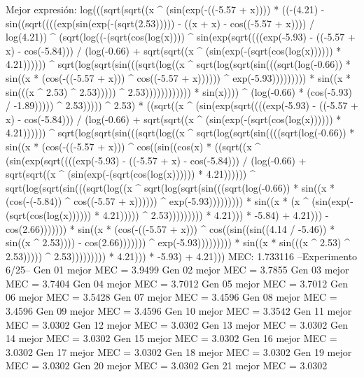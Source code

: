 Mejor expresión: log(((sqrt(sqrt((x ^ (sin(exp(-((-5.57 + x)))) * ((-(4.21) - sin((sqrt((((exp(sin(exp(-(sqrt(2.53))))) - ((x + x) - cos((-5.57 + x)))) / log(4.21)) ^ (sqrt(log((-(sqrt(cos(log(x)))) ^ sin(exp(sqrt((((exp(-5.93) - ((-5.57 + x) - cos(-5.84))) / (log(-0.66) + sqrt(sqrt((x ^ (sin(exp(-(sqrt(cos(log(x)))))) * 4.21)))))) ^ sqrt(log(sqrt(sin(((sqrt(log((x ^ sqrt(log(sqrt(sin(((sqrt(log(-0.66)) * sin((x * (cos(-((-5.57 + x))) ^ cos((-5.57 + x)))))) ^ exp(-5.93))))))))) * sin((x * sin(((x ^ 2.53) ^ 2.53))))) ^ 2.53)))))))))))) * sin(x)))) ^ (log(-0.66) * (cos(-5.93) / -1.89))))) ^ 2.53))))) ^ 2.53) * ((sqrt((x ^ (sin(exp(sqrt((((exp(-5.93) - ((-5.57 + x) - cos(-5.84))) / (log(-0.66) + sqrt(sqrt((x ^ (sin(exp(-(sqrt(cos(log(x)))))) * 4.21)))))) ^ sqrt(log(sqrt(sin(((sqrt(log((x ^ sqrt(log(sqrt(sin((((sqrt(log(-0.66)) * sin((x * (cos(-((-5.57 + x))) ^ cos((sin((cos(x) * ((sqrt((x ^ (sin(exp(sqrt((((exp(-5.93) - ((-5.57 + x) - cos(-5.84))) / (log(-0.66) + sqrt(sqrt((x ^ (sin(exp(-(sqrt(cos(log(x)))))) * 4.21)))))) ^ sqrt(log(sqrt(sin(((sqrt(log((x ^ sqrt(log(sqrt(sin(((sqrt(log(-0.66)) * sin((x * (cos(-(-5.84)) ^ cos((-5.57 + x)))))) ^ exp(-5.93))))))))) * sin((x * (x ^ (sin(exp(-(sqrt(cos(log(x)))))) * 4.21))))) ^ 2.53))))))))) * 4.21))) * -5.84) + 4.21))) - cos(2.66))))))) * sin((x * (cos(-((-5.57 + x))) ^ cos((sin((sin((4.14 / -5.46)) * sin((x ^ 2.53)))) - cos(2.66))))))) ^ exp(-5.93))))))))) * sin((x * sin(((x ^ 2.53) ^ 2.53))))) ^ 2.53))))))))) * 4.21))) * -5.93) + 4.21)))
MEC: 1.733116
--Experimento 
 6/25--
Gen 01 mejor MEC = 3.9499
Gen 02 mejor MEC = 3.7855
Gen 03 mejor MEC = 3.7404
Gen 04 mejor MEC = 3.7012
Gen 05 mejor MEC = 3.7012
Gen 06 mejor MEC = 3.5428
Gen 07 mejor MEC = 3.4596
Gen 08 mejor MEC = 3.4596
Gen 09 mejor MEC = 3.4596
Gen 10 mejor MEC = 3.3542
Gen 11 mejor MEC = 3.0302
Gen 12 mejor MEC = 3.0302
Gen 13 mejor MEC = 3.0302
Gen 14 mejor MEC = 3.0302
Gen 15 mejor MEC = 3.0302
Gen 16 mejor MEC = 3.0302
Gen 17 mejor MEC = 3.0302
Gen 18 mejor MEC = 3.0302
Gen 19 mejor MEC = 3.0302
Gen 20 mejor MEC = 3.0302
Gen 21 mejor MEC = 3.0302

